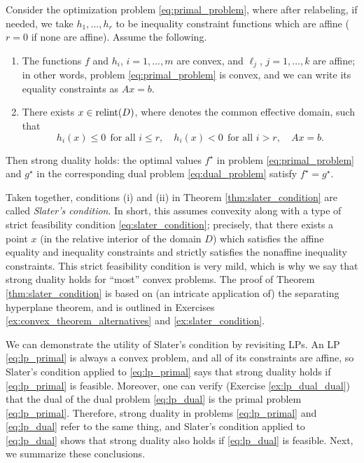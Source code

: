 \begin{Theorem}
\label{thm:slater_condition}
Consider the optimization problem \eqref{eq:primal_problem}, where after 
relabeling, if needed, we take $h_1, \dots, h_r$ to be inequality constraint
functions which are affine ($r = 0$ if none are affine). Assume the following.         

\begin{enumerate}[label=(\roman*)]
\item The functions $f$ and $h_i$, $i=1,\dots,m$ are convex, and $\ell_j$,
  $j=1,\dots,k$ are affine; in other words, problem \eqref{eq:primal_problem} is
  convex, and we can write its equality constraints as $Ax = b$.      

\item There exists $x \in \operatorname{relint}(D)$, where  denotes the common effective domain, such that      
  \begin{equation}
  \label{eq:slater_condition}
  h_i(x) \leq 0 \;\, \text{for all $i \leq r$}, \quad
  h_i(x) < 0 \;\, \text{for all $i > r$}, \quad Ax = b. 
  \end{equation}
\end{enumerate}

Then strong duality holds: the optimal values $f^\star$ in problem
\eqref{eq:primal_problem} and $g^\star$ in the corresponding dual problem  
\eqref{eq:dual_problem} satisfy $f^\star = g^\star$. 
\end{Theorem}

Taken together, conditions (i) and (ii) in Theorem \ref{thm:slater_condition}
are called \emph{Slater's condition}. In short, this assumes convexity along  
with a type of strict feasibility condition \eqref{eq:slater_condition};
precisely, that there exists a point $x$ (in the relative interior of the domain
$D$) which satisfies the affine equality and inequality constraints and strictly
satisfies the nonaffine inequality constraints. This strict feasibility
condition is very mild, which is why we say that strong duality holds for
``most'' convex problems. The proof of Theorem \ref{thm:slater_condition} is
based on (an intricate application of) the separating hyperplane theorem, and is
outlined in Exercises \ref{ex:convex_theorem_alternatives} and
\ref{ex:slater_condition}.    

We can demonstrate the utility of Slater's condition by revisiting LPs. An LP
\eqref{eq:lp_primal} is always a convex problem, and all of its constraints are
affine, so Slater's condition applied to \eqref{eq:lp_primal} says that strong
duality holds if \eqref{eq:lp_primal} is feasible. Moreover, one can verify
(Exercise \ref{ex:lp_dual_dual}) that the dual of the dual problem
\eqref{eq:lp_dual} is the primal problem \eqref{eq:lp_primal}. Therefore, strong
duality in problems \eqref{eq:lp_primal} and \eqref{eq:lp_dual} refer to the
same thing, and Slater's condition applied to \eqref{eq:lp_dual} shows that
strong duality also holds if \eqref{eq:lp_dual} is feasible. Next, we summarize
these conclusions.  

